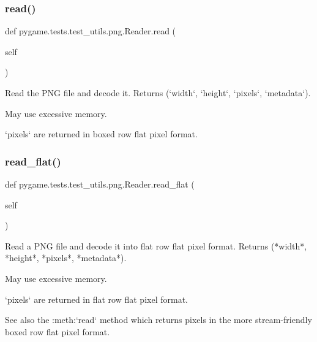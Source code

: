\subsubsection{\texorpdfstring{read()}{read()}}
{\footnotesize\ttfamily def pygame.\+tests.\+test\+\_\+utils.\+png.\+Reader.\+read (\begin{DoxyParamCaption}\item[{}]{self }\end{DoxyParamCaption})}

\begin{DoxyVerb}Read the PNG file and decode it.  Returns (`width`, `height`,
`pixels`, `metadata`).

May use excessive memory.

`pixels` are returned in boxed row flat pixel format.
\end{DoxyVerb}
 \mbox{\label{classpygame_1_1tests_1_1test__utils_1_1png_1_1_reader_a6a25b395fa47de1e1377798eb0f84d1b}} 
\subsubsection{\texorpdfstring{read\+\_\+flat()}{read\_flat()}}
{\footnotesize\ttfamily def pygame.\+tests.\+test\+\_\+utils.\+png.\+Reader.\+read\+\_\+flat (\begin{DoxyParamCaption}\item[{}]{self }\end{DoxyParamCaption})}

\begin{DoxyVerb}Read a PNG file and decode it into flat row flat pixel format.
Returns (*width*, *height*, *pixels*, *metadata*).

May use excessive memory.

`pixels` are returned in flat row flat pixel format.

See also the :meth:`read` method which returns pixels in the
more stream-friendly boxed row flat pixel format.
\end{DoxyVerb}
 \mbox{\label{classpygame_1_1tests_1_1test__utils_1_1png_1_1_reader_a3acdf9b3eccaa75e390e286af906f666}} 
